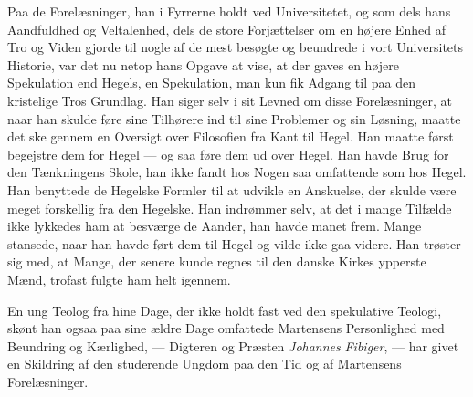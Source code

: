 \documentclass[12pt,a4paper,openany]{book}
\newcommand{\opage}[1]{\marginnote{\footnotesize\textit{[#1]}}}
\begin{document}
Paa de Forelæsninger, han i Fyrrerne holdt ved Universitetet, og som dels hans
Aandfuldhed og Veltalenhed, dels de store Forjættelser om en højere Enhed af
Tro og Viden gjorde til nogle af de mest besøgte og beundrede i vort
Universitets Historie, var det nu netop hans Opgave at vise, at der gaves en
højere Spekulation end Hegels, en Spekulation, man kun fik Adgang til paa den
kristelige Tros Grundlag. Han siger
\setcounter{footnote}{0}%
\opage{142}selv i sit Levned om disse Forelæsninger, at naar han skulde føre
sine Tilhørere ind til sine Problemer og sin Løsning, maatte det ske gennem en
Oversigt over Filosofien fra Kant til Hegel. Han maatte først begejstre dem for
Hegel --- og saa føre dem ud over Hegel. Han havde Brug for den Tænkningens
Skole, han ikke fandt hos Nogen saa omfattende som hos Hegel. Han benyttede de
Hegelske Formler til at udvikle en Anskuelse, der skulde være meget forskellig
fra den Hegelske. Han indrømmer selv, at det i mange Tilfælde ikke lykkedes ham
at besværge de Aander, han havde manet frem. Mange stansede, naar han havde
ført dem til Hegel og vilde ikke gaa videre. Han trøster sig med, at Mange, der
senere kunde regnes til den danske Kirkes ypperste Mænd, trofast fulgte ham
helt igennem.

En ung Teolog fra hine Dage, der ikke holdt fast ved den spekulative Teologi,
skønt han ogsaa paa sine ældre Dage omfattede Martensens Personlighed med
Beundring og Kærlighed, --- Digteren og Præsten \emph{Johannes} \emph{Fibiger},
--- har givet en Skildring af den studerende Ungdom paa den Tid og af
Martensens Forelæsninger.
\end{document}
